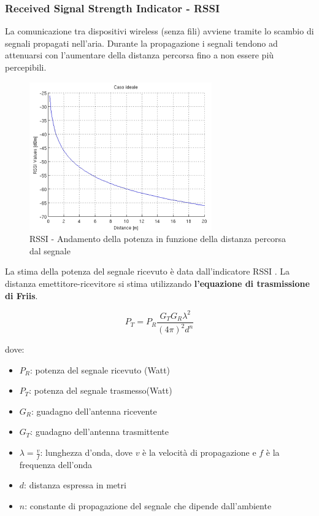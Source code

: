 \subsubsection{Received Signal Strength Indicator - RSSI}
\label{rssi}
La comunicazione \cite{IPS2} tra dispositivi wireless (senza fili) avviene tramite lo scambio di segnali propagati nell’aria. Durante la propagazione i segnali tendono ad attenuarsi con l'aumentare della distanza percorsa fino a non essere più percepibili.

\begin{figure}[H]  
	\centering 
	\includegraphics[scale=1.2]{ContestoApplicativo/signal.PNG}
	\caption{RSSI - Andamento della potenza in funzione della distanza percorsa dal segnale}
	\label{fig:signal}
\end{figure}

La stima della potenza del segnale ricevuto è data dall’indicatore RSSI \cite{rssi}. La distanza emettitore-ricevitore si stima utilizzando \textbf{l’equazione di trasmissione di Friis}.

\begin{equation}
		P_{T}=P_{R} \dfrac{G_{T}G_{R}\lambda^2}{(4\pi)^2d^n}
		\label{eq1}
\end{equation}

dove:
\begin{itemize}
	\item $P_{R}$: potenza del segnale ricevuto (Watt)
	\item $P_{T}$: potenza del segnale trasmesso(Watt)
	\item $G_{R}$: guadagno dell'antenna ricevente
	\item $G_{T}$: guadagno dell'antenna trasmittente
	\item $\lambda=\frac{v}{f}$: lunghezza d'onda, dove $v$ è la velocità di propagazione e $f$ è la frequenza dell'onda
	\item $d$: distanza espressa in metri
	\item $n$: constante di propagazione del segnale che dipende dall'ambiente 
\end{itemize}

